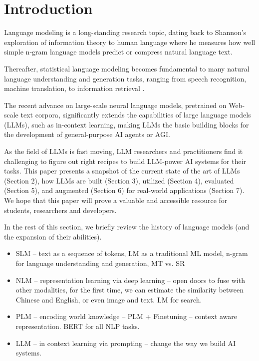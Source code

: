 \section{Introduction}



Language modeling is a long-standing research topic, dating back to Shannon's exploration of  information theory to human language where he measures how well simple n-gram language models predict or compress natural language text. 

Thereafter, statistical language modeling becomes fundamental to many natural language understanding and generation tasks, ranging from speech recognition, machine translation, to information retrieval \cite{jelinek1998statistical,manning1999foundations,manning2009introduction}.

The recent advance on large-scale neural language models, pretrained on Web-scale text corpora, significantly extends the capabilities of large language models (LLMs), such as in-context learning, making LLMs the basic building blocks for the development of general-purpose AI agents or AGI.

As the field of LLMs is fast moving, LLM researchers and practitioners find it challenging to figure out right recipes to build LLM-power AI systems for their tasks. This paper presents a snapshot of the current state of the art of LLMs (Section 2), how LLMs are built (Section 3), utilized (Section 4), evaluated (Section 5), and augmented (Section 6) for real-world applications (Section 7). We hope that this paper will prove a valuable and accessible resource for students, researchers and developers. 

In the rest of this section, we briefly review the history of language models (and the expansion of their abilities).
\begin{itemize}
    \item SLM -- text as a sequence of tokens, LM as a traditional ML model, n-gram for language understanding and generation, MT vs. SR 
    \item NLM -- representation learning via deep learning -- open doors to fuse with other modalities, for the first time, we can estimate the similarity between Chinese and English, or even image and text. LM for search.
    \item PLM -- encoding world knowledge -- PLM + Finetuning -- context aware representation. BERT for all NLP tasks.
    \item LLM -- in context learning via prompting -- change the way we build AI systems.
\end{itemize}